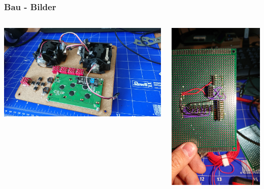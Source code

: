 \documentclass[12pt,a4paper, ngerman]{beamer}
\begin{document}
\begin{frame}
\frametitle{Bau - Bilder}
\begin{columns}
\begin{center}
\includegraphics[width=1\textwidth]{Ferni (3).jpeg}
\end{center}
\begin{center}
\includegraphics[width=1\textwidth]{Ferni (5).jpeg}

\end{center}
\end{columns}
\end{frame}
\end{document}
